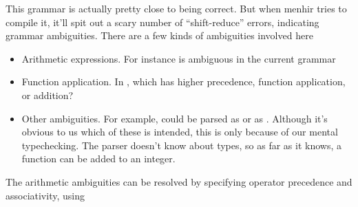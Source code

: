 \message{ !name(report.tex)}\documentclass[pageno]{jpaper}
\begin{document}
{{\begin{figure}
\begin{lstlisting}
\end{lstlisting}
\end{figure}
\FloatBarrier

This grammar is actually pretty close to being correct. But when menhir tries to compile it, it'll spit out
a scary number of ``shift-reduce'' errors, indicating grammar ambiguities.
There are a few kinds of ambiguities involved here
\begin{itemize}
\item Arithmetic expressions. For instance  is ambiguous in the current grammar
\item Function application. In , which has higher precedence, function
      application, or addition?
\item Other ambiguities.  For example,  could be parsed as
       or as .  Although it's obvious to us
      which of these is intended, this is only because of our mental typechecking.  The parser doesn't know
      about types, so as far as it knows, a function can be added to an integer.
\end{itemize}
The arithmetic ambiguities
can be resolved by specifying operator precedence and associativity, using \lsti{%

The other shift-reduce errors, as far as I know, cannot be fixed with precedence and associativity annotations
in menhir.  Instead, we have to add a few auxiliary nonterminal symbols.  We can do it like so:

\FloatBarrier
\begin{figure}
\begin{lstlisting}

exp =
  | FUN; v = ID; COLON; t = typ; BIGARROW; e = exp   { Fun (v,t,e) }
  | IF; e1 = exp; THEN; e2 = exp; ELSE; e3 = exp     { If (e1,e2,e3) }
  | e = exp1                                         { e }
 
exp1 = 
  | e1 = exp1; PLUS; e2 = exp1                       { Op(e1,Plus,e2) }
  | e1 = exp1; MINUS; e2 = exp1                      { Op(e1,Minus,e2) }
  | e1 = exp1; STAR; e2 = exp1                       { Op(e1,Times,e2) }
  | e1 = exp1; DIV; e2 = exp1                        { Op(e1,Div,e2) }
  | e = exp2                                         { e }

exp2 =
  | LPAREN; e = exp; RPAREN                    { e }
  | e1 = exp1; e2 = exp1                       { App(e1,e2) }
  | n = INT                                    { Constant (Int n) }
  | TRUE                                       { Constant (Bool true) }
  | FALSE                                      { Constant (Bool false) }


\end{lstlisting}
\end{figure}}}}
\end{document}
